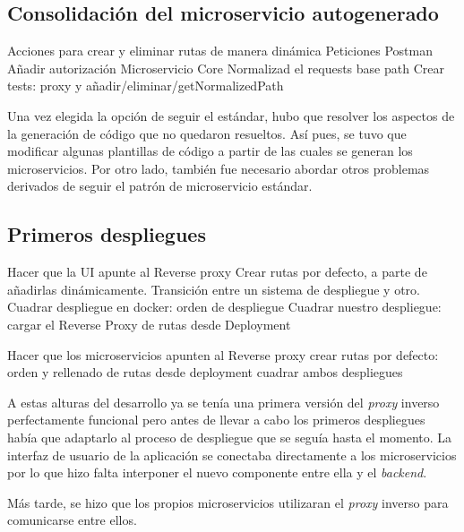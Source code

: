 \documentclass[11pt,spanish,listoffigures]{tfgetsinf}
\begin{document}


		\subsection{Consolidación del microservicio autogenerado}

Acciones para crear y eliminar rutas de manera dinámica
Peticiones Postman
Añadir autorización
Microservicio Core
Normalizad el requests base path
Crear tests: proxy y añadir/eliminar/getNormalizedPath

Una vez elegida la opción de seguir el estándar, hubo que resolver los aspectos de la generación de código que no quedaron resueltos. Así pues, se tuvo que modificar algunas plantillas de código a partir de las cuales se generan los microservicios. Por otro lado, también fue necesario abordar otros problemas derivados de seguir el patrón de microservicio estándar.


		\subsection{Primeros despliegues}

Hacer que la UI apunte al Reverse proxy
Crear rutas por defecto, a parte de añadirlas dinámicamente. Transición entre un sistema de despliegue y otro.
Cuadrar despliegue en docker: orden de despliegue
Cuadrar nuestro despliegue: cargar el Reverse Proxy de rutas desde Deployment

Hacer que los microservicios apunten al Reverse proxy
crear rutas por defecto: orden y rellenado de rutas desde deployment
cuadrar ambos despliegues

A estas alturas del desarrollo ya se tenía una primera versión del \emph{proxy} inverso perfectamente funcional pero antes de llevar a cabo los primeros despliegues había que adaptarlo al proceso de despliegue que se seguía hasta el momento. La interfaz de usuario de la aplicación se conectaba directamente a los microservicios por lo que hizo falta interponer el nuevo componente entre ella y el \emph{backend}.

Más tarde, se hizo que los propios microservicios utilizaran el \emph{proxy} inverso para comunicarse entre ellos.
\end{document}
